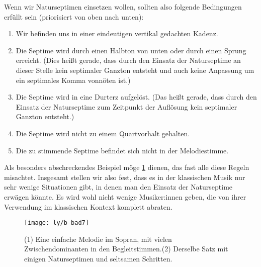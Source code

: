 Wenn wir Naturseptimen einsetzen wollen, sollten also folgende Bedingungen
erfüllt sein (priorisiert von oben nach unten):

\begin{enumerate}
\item Wir befinden uns in einer eindeutigen vertikal gedachten Kadenz.
\item Die Septime wird durch einen Halbton von unten oder durch einen Sprung
  erreicht. (Dies heißt gerade, dass durch den Einsatz der Naturseptime an
  dieser Stelle kein septimaler Ganzton entsteht und auch keine Anpassung um ein
  septimales Komma vonnöten ist.)
\item Die Septime wird in eine Durterz aufgelöst. (Das heißt gerade, dass durch
  den Einsatz der Naturseptime zum Zeitpunkt der Auflösung kein septimaler
  Ganzton entsteht.)
\item Die Septime wird nicht zu einem Quartvorhalt gehalten.
\item Die zu stimmende Septime befindet sich nicht in der Melodiestimme.
\end{enumerate}

Als besonders abschreckendes Beispiel möge \cref{fig:bad7} dienen, das fast alle
diese Regeln misachtet. Insgesamt stellen wir also fest, dass es in der
klassischen Musik nur sehr wenige Situationen gibt, in denen man den Einsatz der
Naturseptime erwägen könnte.  Es wird wohl nicht wenige Musiker:innen geben, die
von ihrer Verwendung im klassischen Kontext komplett abraten.

\begin{figure}
  \centering
  \texttt{[image: ly/b-bad7]}
  \caption{(1) Eine einfache Melodie im Sopran, mit vielen Zwischendominanten in
    den Begleitstimmen.\quad (2) Derselbe Satz mit einigen
    Naturseptimen und seltsamen Schritten.}\label{fig:bad7}
\end{figure}

